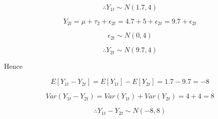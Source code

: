 \documentclass[11pt]{article}
\begin{document}
\[\therefore Y_{1t} \sim N(1.7, 4)\]

\[Y_{2t} = \mu + \tau_2 + \epsilon_{2t} = 4.7 + 5 + \epsilon_{2t} = 9.7 + \epsilon_{2t}\]

\[\epsilon_{2t} \sim N(0, 4)\]

\[\therefore Y_{2t} \sim N(9.7, 4)\]

Hence

\[E \left [Y_{1t} - Y_{2t} \right ] = E \left [ Y_{1t} \right ] - E \left [ Y_{2t} \right ] = 1.7 - 9.7 = -8\]

\[Var \left (Y_{1t} - Y_{2t} \right ) = Var \left (Y_{1t} \right ) + Var \left (Y_{2t} \right ) = 4+4 = 8\]

\[\therefore Y_{1t} - Y_{2t} \sim N(-8, 8)\]


    
    
    
    
\end{document}
